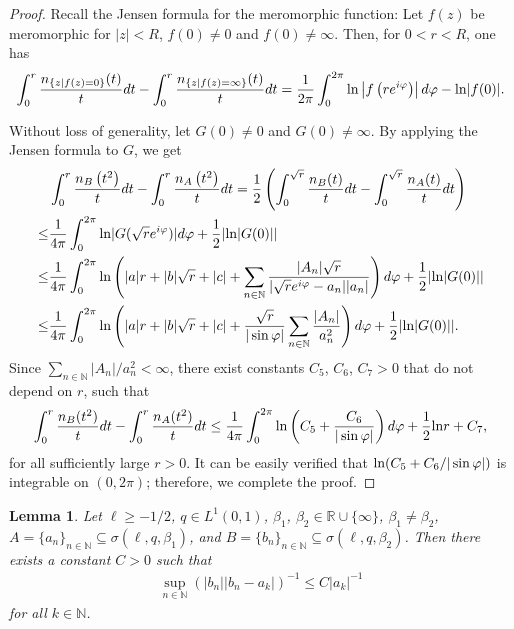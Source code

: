 \documentclass[reqno,12pt,centertags]{amsart}
\renewcommand{\ln}{\text{\rm ln}}
\numberwithin{equation}{section}
\newtheorem{lemma}[theorem]{Lemma}
\theoremstyle{definition}
\begin{document}
\begin{proof}
Recall the Jensen formula for the meromorphic function:
Let $f(z)$ be meromorphic for $|z|<R$, $f(0) \neq 0$ and $f(0) \neq \infty$. Then, for $0<r<R$, one has 
\begin{align*}
\int_0^r \frac{n_{\{z\mid f(z)=0\}}(t)}{t}dt
-\int_0^r \frac{n_{\{z\mid f(z)= \infty\}}(t)}{t}dt=\frac{1}{2\pi} \int_0^{2 \pi} \ln \left|f\left(r e^{i \varphi}\right)\right| d \varphi-\ln|f(0)|.
\end{align*}

Without loss of generality, let $G(0) \neq 0$ and $G(0) \neq \infty$. By applying the Jensen formula to $G$, we get
\begin{align*}
&\int_0^r \frac{n_B\left(t^2\right)}{t} d t-\int_0^r \frac{n_A\left(t^2\right)}{t}dt
=\frac{1}{2}\left(\int_0^{\sqrt{r}}\frac{n_B(t)}{t}dt
-\int_0^{\sqrt{r}} \frac{n_A(t)}{t}dt\right)\\
\leq& \frac{1}{4\pi} 
\int_0^{2\pi} \ln| G(\sqrt{r} e^{i\varphi})|d\varphi
+\frac{1}{2}|\ln| G(0)|| \\
\leq & \frac{1}{4\pi} 
\int_0^{2 \pi} \ln \left(|a|r+|b|\sqrt{r}+|c|
+\sum_{n\in\mathbb{N}} \frac{|A_n|\sqrt{r}}{|\sqrt{r} e^{i \varphi}-a_n||a_n|}\right)d\varphi
+\frac{1}{2}|\ln|G(0)|| \\
\leq& \frac{1}{4\pi} 
\int_0^{2 \pi}\ln\left(|a|r+|b|\sqrt{r}+|c|
+\frac{\sqrt{r}}{|\sin \varphi|}
\sum_{n\in\mathbb{N}}\frac{|A_n|}{a_n^2}\right)d\varphi
+\frac{1}{2}|\ln|G(0)||. 
\end{align*}
Since $\sum_{n \in \mathbb{N}}|A_n|/a_n^2<\infty$, there exist constants $C_{5}$, $C_{6}$, $C_{7}> 0$ that do not depend on $r$, such that
\begin{align*}
\int_0^r \frac{n_B(t^2)}{t} d t-\int_0^r \frac{n_A(t^2)}{t}dt
\leq \frac{1}{4\pi}
\int_0^{2 \pi}\ln\left(C_5+\frac{C_6}{|\sin \varphi|}\right)d\varphi+\frac{1}{2}\ln r+C_7,
\end{align*}
for all sufficiently large $r>0$. It can be easily verified that 
$\ln(C_5+C_6/|\sin \varphi|)$ is integrable on $(0,2\pi)$;  
therefore, we complete the proof. 
\end{proof}

\begin{lemma}\label{l5.4}
Let $\ell\geq-1/2$, $q\in L^{1}(0,1)$, $\beta_{1}$, $\beta_{2}\in\mathbb{R}\cup\{\infty\}$, $\beta_{1}\neq\beta_{2}$, 
$A=\{a_{n}\}_{n\in\mathbb{N}}\subseteq\sigma(\ell, q, \beta_1)$, and
$B=\{b_{n}\}_{n \in \mathbb{N}}\subseteq\sigma(\ell, q, \beta_2)$.
Then there exists a constant $C>0$ such that
\begin{align}\label{e5.19}
\sup_{n\in\mathbb{N}}(|b_{n}||b_{n}-a_{k}|)^{-1} \leq C|a_{k}|^{-1}
\end{align}
for all $k\in\mathbb{N}$.
\end{lemma}
\end{document}
